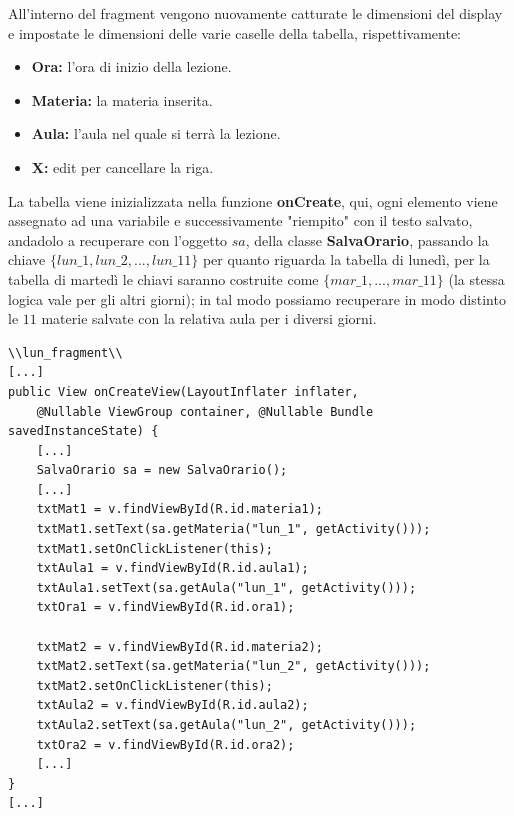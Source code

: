 \documentclass[a4paper, 50pt, twoside]{article}
\begin{document}
All'interno del fragment vengono nuovamente catturate le dimensioni del display e impostate le dimensioni delle varie caselle della tabella, rispettivamente:
\begin{itemize}
\item \textbf{Ora:} l'ora di inizio della lezione.
\item \textbf{Materia:} la materia inserita.
\item \textbf{Aula:} l'aula nel quale si terrà la lezione.
\item \textbf{X:} edit per cancellare la riga.
\end{itemize}

La tabella viene inizializzata nella funzione \textbf{onCreate}, qui, ogni elemento viene assegnato ad una variabile e successivamente "riempito" con il testo salvato, andadolo a recuperare con l'oggetto $sa$, della classe \textbf{SalvaOrario}, passando la chiave $\{lun\_1, lun\_2,..., lun\_11\}$ per quanto riguarda la tabella di lunedì, per la tabella di martedì le chiavi saranno costruite come $\{mar\_1,...,mar\_11\}$ (la stessa logica vale per gli altri giorni); in tal modo possiamo recuperare in modo distinto le $11$ materie salvate con la relativa aula per i diversi giorni.

\begin{lstlisting}
\\lun_fragment\\
[...]
public View onCreateView(LayoutInflater inflater, 
	@Nullable ViewGroup container, @Nullable Bundle savedInstanceState) {
	[...]
	SalvaOrario sa = new SalvaOrario();
	[...]
	txtMat1 = v.findViewById(R.id.materia1);
	txtMat1.setText(sa.getMateria("lun_1", getActivity()));
	txtMat1.setOnClickListener(this);
	txtAula1 = v.findViewById(R.id.aula1);
	txtAula1.setText(sa.getAula("lun_1", getActivity()));
	txtOra1 = v.findViewById(R.id.ora1);
	
	txtMat2 = v.findViewById(R.id.materia2);
	txtMat2.setText(sa.getMateria("lun_2", getActivity()));
	txtMat2.setOnClickListener(this);
	txtAula2 = v.findViewById(R.id.aula2);
	txtAula2.setText(sa.getAula("lun_2", getActivity()));
	txtOra2 = v.findViewById(R.id.ora2);
	[...]
}
[...]
\end{lstlisting}
\end{document}
